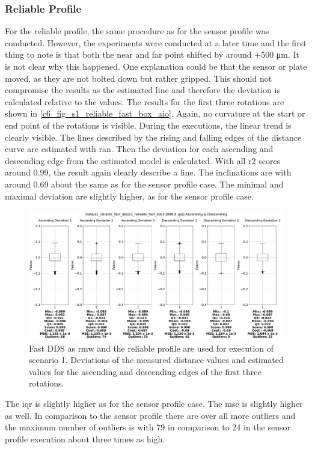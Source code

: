 \subsubsection{Reliable Profile}
For the reliable profile, the same procedure as for the sensor profile was conducted. However, the experiments were conducted at a later time and the first thing to note is that both the near and far point shifted by around +500 \si{\micro\meter}.
It is not clear why this happened. One explanation could be that the sensor or plate moved, as they are not bolted down but rather gripped. This should not compromise the results as the estimated line and therefore the deviation is calculated relative to the values.\newline 
The results for the first three rotations are shown in \autoref{c6_fig_s1_reliable_fast_box_aio}. Again, no curvature at the start or end point of the rotations is visible. During the executions, the linear trend is clearly visible. The lines described by the rising and falling edges of the distance curve are estimated with \gls{ran}. Then the deviation for each ascending and descending edge from the estimated model is calculated. With all \gls{r2} scores around 0.99, the result again clearly describe a line. The inclinations are with around 0.69 about the same as for the sensor profile case. The minimal and maximal deviation are slightly higher, as for the sensor profile case. 
\begin{figure}[H]
	\centering
	\includegraphics[width=1\textwidth]{Figures/c6/s1/s1_reliable_fast_dds_3_box_aio.pdf}
	\caption{Fast DDS as \gls{rmw} and the reliable profile are used for execution of scenario 1. Deviations of the measured distance values and estimated values for the ascending and descending edges of the first three rotations.}
	\label{c6_fig_s1_reliable_fast_box_aio}
\end{figure}
The \gls{iqr} is slightly higher as for the sensor profile case. The \gls{mse} is slightly higher as well. In comparison to the sensor profile there are over all more outliers and the maximum number of outliers is with 79 in comparison to 24 in the sensor profile execution about three times as high.\newline
